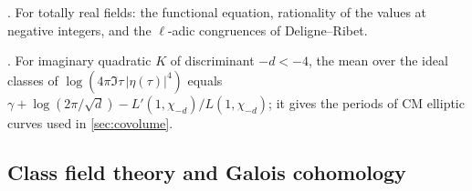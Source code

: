 \begin{description}[leftmargin=0pt,itemsep=1pt,parsep=0pt,font=\normalfont\itshape]
\item[Partial zeta functions] \cite{Klingen1962,Siegel1970,DeligneRibet1980}.  For totally real
  fields: the functional equation, rationality of the values at negative integers, and the
  $\ell$-adic congruences of Deligne--Ribet.  
\item[Chowla--Selberg formula] \cite{ChowlaSelberg1967}.  For imaginary quadratic $K$ of
  discriminant $-d<-4$, the mean over the ideal classes of $\log(4\pi\Im\tau\,|\eta(\tau)|^4)$ equals
  $\gamma+\log(2\pi/\sqrt d)-L'(1,\chi_{-d})/L(1,\chi_{-d})$; it gives the periods of CM elliptic
  curves used in \cref{sec:covolume}.  
\end{description}

\subsection{Class field theory and Galois cohomology}\label{sec:literature:cft}

